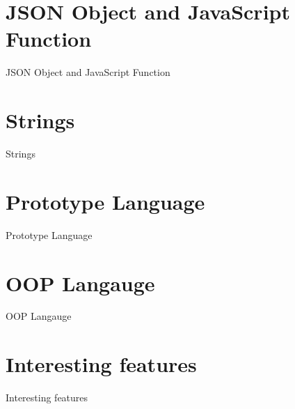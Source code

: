 \documentclass[handout, 14pt]{beamer}
\begin{document}
\def\title{JSON Object and JavaScript Function}
\section{\title}
\begin{frame}[fragile]{}%
\begin{center}%
%
%
\title
\end{center}%
\end{frame}
  

\def\title{Strings}
\section{\title}
\begin{frame}[fragile]{}%
\begin{center}%
%
%
\title
\end{center}%
\end{frame}
  

\def\title{Prototype Language}
\section{\title}
\begin{frame}[fragile]{}%
\begin{center}%
%
%
\title
\end{center}%
\end{frame}
  

\def\title{OOP Langauge}
\section{\title}
\begin{frame}[fragile]{}%
\begin{center}%
%
%
\title
\end{center}%
\end{frame}
  

\def\title{Interesting features}
\section{\title}
\begin{frame}[fragile]{}%
\begin{center}%
%
%
\title
\end{center}%
\end{frame}
  
\end{document}
